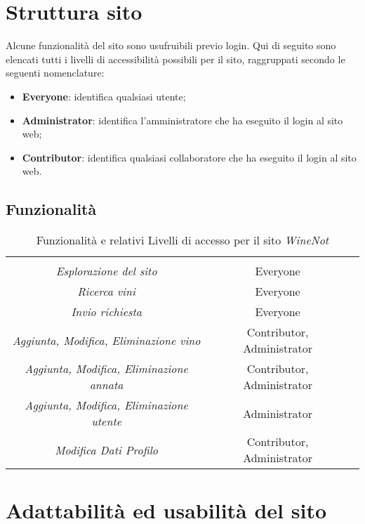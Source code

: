 \section{Struttura sito}

Alcune funzionalità del sito sono usufruibili previo login. Qui di
seguito sono elencati tutti i livelli di accessibilità possibili per il sito, raggruppati secondo le seguenti nomenclature:
\begin{itemize}
	\item \textbf{Everyone}: identifica qualsiasi utente;
	\item \textbf{Administrator}: identifica l'amministratore che ha eseguito il login al sito web;
	\item \textbf{Contributor}: identifica qualsiasi collaboratore che ha eseguito il login al sito web.
\end{itemize}




\subsection{Funzionalità}

\begin{table}[H]
	\centering
	\begin{tabular}{c|c|C{4cm}}
		\rowcolorhead
		 &  \\
		\rowcolorlight
		\textit{Esplorazione del sito}  & Everyone \\
		\rowcolordark
		\textit{Ricerca vini}  & Everyone \\
		\rowcolorlight
		\textit{Invio richiesta}  & Everyone \\
		\rowcolordark
		\textit{Aggiunta, Modifica, Eliminazione vino}  & Contributor, Administrator \\
		\rowcolorlight
		\textit{Aggiunta, Modifica, Eliminazione annata}  & Contributor, Administrator \\
		\rowcolordark
		\textit{Aggiunta, Modifica, Eliminazione utente}  & Administrator \\
		\rowcolorlight
		\textit{Modifica Dati Profilo}  & Contributor, Administrator \\
		
	\end{tabular}
	\caption{Funzionalità e relativi Livelli di accesso per il sito \textit{WineNot}}
\end{table}


\section{Adattabilità ed usabilità del sito}

